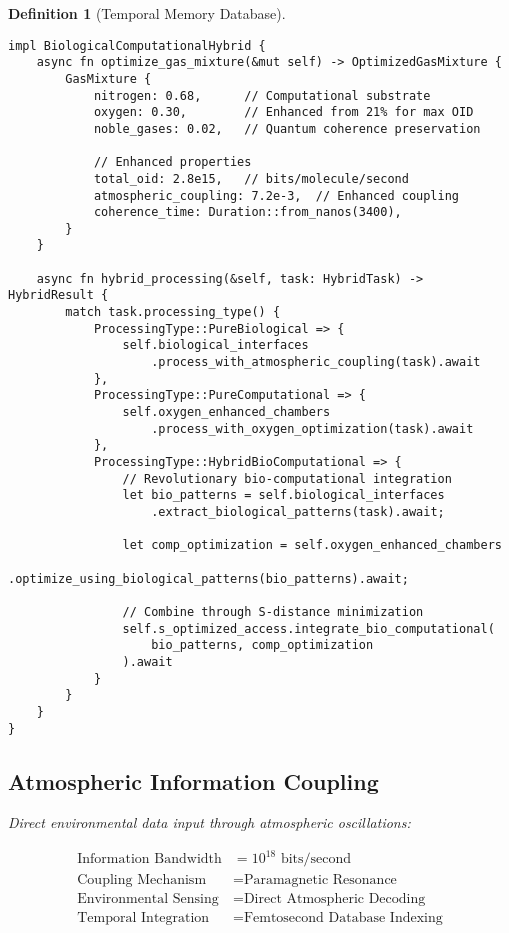 \documentclass[12pt]{article}
\newtheorem{definition}[theorem]{Definition}
\begin{document}
\begin{definition}[Temporal Memory Database]
\begin{lstlisting}[caption=Bio-Compatible Computation]
impl BiologicalComputationalHybrid {
    async fn optimize_gas_mixture(&mut self) -> OptimizedGasMixture {
        GasMixture {
            nitrogen: 0.68,      // Computational substrate
            oxygen: 0.30,        // Enhanced from 21% for max OID
            noble_gases: 0.02,   // Quantum coherence preservation
            
            // Enhanced properties
            total_oid: 2.8e15,   // bits/molecule/second
            atmospheric_coupling: 7.2e-3,  // Enhanced coupling
            coherence_time: Duration::from_nanos(3400),
        }
    }
    
    async fn hybrid_processing(&self, task: HybridTask) -> HybridResult {
        match task.processing_type() {
            ProcessingType::PureBiological => {
                self.biological_interfaces
                    .process_with_atmospheric_coupling(task).await
            },
            ProcessingType::PureComputational => {
                self.oxygen_enhanced_chambers
                    .process_with_oxygen_optimization(task).await  
            },
            ProcessingType::HybridBioComputational => {
                // Revolutionary bio-computational integration
                let bio_patterns = self.biological_interfaces
                    .extract_biological_patterns(task).await;
                
                let comp_optimization = self.oxygen_enhanced_chambers
                    .optimize_using_biological_patterns(bio_patterns).await;
                
                // Combine through S-distance minimization
                self.s_optimized_access.integrate_bio_computational(
                    bio_patterns, comp_optimization
                ).await
            }
        }
    }
}
\end{lstlisting}

\subsection{Atmospheric Information Coupling}

Direct environmental data input through atmospheric oscillations:

\begin{align}
\text{Information Bandwidth} &= 10^{18} \text{ bits/second} \\
\text{Coupling Mechanism} &= \text{Paramagnetic Resonance} \\
\text{Environmental Sensing} &= \text{Direct Atmospheric Decoding} \\
\text{Temporal Integration} &= \text{Femtosecond Database Indexing}
\end{align}


\end{definition}
\end{document}
